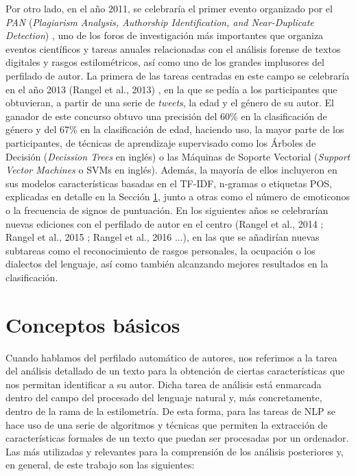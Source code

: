 \bigskip
Por otro lado, en el año 2011, se celebraría el primer evento organizado por el \textit{PAN} (\textit{Plagiarism Analysis, Authorship Identification, and Near-Duplicate Detection}) \cite{pan},
uno de los foros de investigación más importantes que organiza eventos científicos y tareas anuales relacionadas con el análisis forense de textos digitales
y rasgos estilométricos, así como uno de los grandes implusores del perfilado de autor. La primera de las tareas centradas en este campo se celebraría en el año 2013 (Rangel et al., 2013) \cite{rangel2013overview},
en la que se pedía a los participantes que obtuvieran, a partir de una serie de \textit{tweets}, la edad y el género de su autor. El ganador de este concurso obtuvo una
precisión del 60\% en la clasificación de género y del 67\% en la clasificación de edad, haciendo uso, la mayor parte de los participantes, de técnicas de aprendizaje
supervisado como los Árboles de Decisión (\textit{Decission Trees} en inglés) o las Máquinas de Soporte Vectorial (\textit{Support Vector Machines} o SVMs en inglés).
Además, la mayoría de ellos incluyeron en sus modelos características basadas en el TF-IDF, n-gramas o etiquetas POS, explicadas en detalle en la Sección \ref{sec:conceptos_basicos},
junto a otras como el número de emoticonos o la frecuencia de signos de puntuación.
En los siguientes años se celebrarían nuevas ediciones con el perfilado de autor en el centro (Rangel et al., 2014 \cite{rangel2014overview}; Rangel et al., 2015 \cite{rangel2015overview};
Rangel et al., 2016 \cite{rangel2016overview}...), en las que se añadirían nuevas subtareas como el reconocimiento de rasgos personales, la ocupación o los dialectos del lenguaje,
así como también alcanzando mejores resultados en la clasificación.

\section{Conceptos básicos}
\label{sec:conceptos_basicos}

Cuando hablamos del perfilado automático de autores, nos referimos a la tarea del análisis detallado de un texto para la obtención de ciertas características
que nos permitan identificar a su autor.
Dicha tarea de análisis está enmarcada dentro del campo del procesado del lenguaje natural y, más concretamente,
dentro de la rama de la estilometría. De esta forma, para las tareas de NLP se hace uso
de una serie de algoritmos y técnicas que permiten la extracción de características formales de un texto que puedan
ser procesadas por un ordenador. Las más utilizadas y relevantes
para la comprensión de los análisis posteriores y, en general, de este trabajo son las siguientes:

